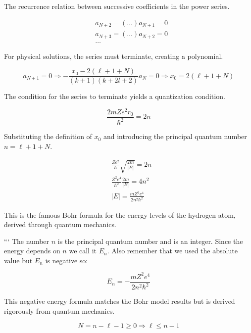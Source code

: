 \documentclass[italian]{HKNdocument}
\begin{document}
The recurrence relation between successive coefficients in the power series.

\begin{align*}
& a_{N+2}=(\ldots) a_{N+1}=0 \\
& a_{N+3}=(\ldots) a_{N+2}=0  \tag{9.62}\\
& \ldots
\end{align*}

For physical solutions, the series must terminate, creating a polynomial.

\begin{equation*}
a_{N+1}=0 \Longrightarrow-\frac{x_{0}-2(\ell+1+N)}{(k+1)(k+2 l+2)} a_{N}=0 \Longrightarrow x_{0}=2(\ell+1+N) \tag{9.63}
\end{equation*}

The condition for the series to terminate yields a quantization condition.

\begin{equation*}
\frac{2 m Z e^{2} r_{0}}{\hbar^{2}}=2 n \tag{9.64}
\end{equation*}

Substituting the definition of $x_0$ and introducing the principal quantum number $n = \ell+1+N$.

\begin{align*}
& \frac{Z e^{2}}{\hbar} \sqrt{\frac{2 m}{|E|}}=2 n \\
& \frac{Z^{2} e^{4}}{\hbar^{2}} \frac{2 m}{|E|}=4 n^{2}  \tag{9.65}\\
& |E|=\frac{m Z^{2} e^{4}}{2 n^{2} \hbar^{2}}
\end{align*}

This is the famous Bohr formula for the energy levels of the hydrogen atom, derived through quantum mechanics.

```
The number $n$ is the principal quantum number and is an integer. Since the energy depends on $n$ we call it $E_{n}$. Also remember that we used the absolute value but $E_{n}$ is negative so:

\begin{equation*}
E_{n}=-\frac{m Z^{2} e^{4}}{2 n^{2} \hbar^{2}} \tag{9.66}
\end{equation*}

This negative energy formula matches the Bohr model results but is derived rigorously from quantum mechanics.

\begin{equation*}
N=n-\ell-1 \geq 0 \Longrightarrow \ell \leq n-1 \tag{9.67}
\end{equation*}
\end{document}
